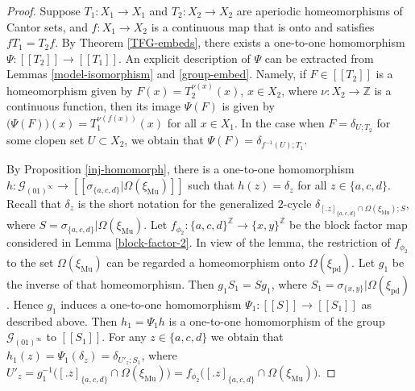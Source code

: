 \documentclass[10pt,a4paper]{amsart}
\def\Om{\Omega}
\def\bZ{\mathbb{Z}}
\def\cG{\mathcal{G}}
\def\de{\delta}
\def\si{\sigma}
\def\xiGE{\xi_{\mathrm{Mu}}}
\def\xipd{\xi_{\mathrm{pd}}}
\begin{document}
\begin{proof}
Suppose $T_1:X_1\to X_1$ and $T_2:X_2\to X_2$ are aperiodic homeomorphisms 
of Cantor sets, and $f:X_1\to X_2$ is a continuous map that is onto and 
satisfies $fT_1=T_2f$.  By Theorem \ref{TFG-embeds}, there exists a 
one-to-one homomorphism $\Psi:[[T_2]]\to[[T_1]]$.  An explicit description 
of $\Psi$ can be extracted from Lemmas \ref{model-isomorphism} and 
\ref{group-embed}.  Namely, if $F\in[[T_2]]$ is a homeomorphism given by 
$F(x)=T_2^{\nu(x)}(x)$, $x\in X_2$, where $\nu:X_2\to\bZ$ is a continuous 
function, then its image $\Psi(F)$ is given by 
$\bigl(\Psi(F)\bigr)(x)=T_1^{\nu(f(x))}(x)$ for all $x\in X_1$.  In the 
case when $F=\de_{U;T_2}$ for some clopen set $U\subset X_2$, we obtain 
that $\Psi(F)=\de_{f^{-1}(U);T_1}$.

By Proposition \ref{inj-homomorph}, there is a one-to-one homomorphism 
$h:\cG_{(01)^\infty}\to[[\si_{\{a,c,d\}}|\Om(\xiGE)]]$ such that 
$h(z)=\de_z$ for all $z\in\{a,c,d\}$.  Recall that $\de_z$ is the short 
notation for the generalized $2$-cycle 
$\de_{[.z]_{\{a,c,d\}}\cap\Om(\xiGE);S}$, where 
$S=\si_{\{a,c,d\}}|\Om(\xiGE)$.  Let 
$f_{\phi_2}:\{a,c,d\}^{\bZ}\to\{x,y\}^{\bZ}$ be the block factor map 
considered in Lemma \ref{block-factor-2}.  In view of the lemma, the 
restriction of $f_{\phi_2}$ to the set $\Om(\xiGE)$ can be regarded a 
homeomorphism onto $\Om(\xipd)$.  Let $g_1$ be the inverse of that 
homeomorphism.  Then $g_1S_1=Sg_1$, where $S_1=\si_{\{x,y\}}|\Om(\xipd)$.
Hence $g_1$ induces a one-to-one homomorphism $\Psi_1:[[S]]\to[[S_1]]$ as 
described above.  Then $h_1=\Psi_1h$ is a one-to-one homomorphism of the 
group $\cG_{(01)^\infty}$ to $[[S_1]]$.  For any $z\in\{a,c,d\}$ we obtain 
that $h_1(z)=\Psi_1(\de_z)=\de_{U'_z;S_1}$, where $U'_z= 
g_1^{-1}\bigl([.z]_{\{a,c,d\}}\cap\Om(\xiGE)\bigr)
=f_{\phi_2}\bigl([.z]_{\{a,c,d\}}\cap\Om(\xiGE)\bigr)$.


\end{proof}
\end{document}
